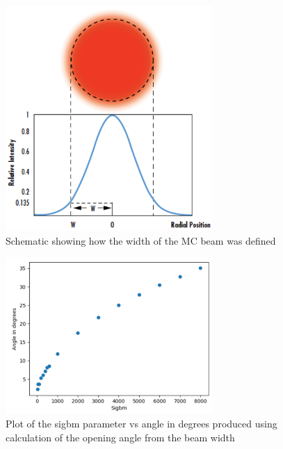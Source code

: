 \begin{figure}
    \centering
    \includegraphics[width=0.7\textwidth]{Figures/beam_width.PNG}
    \caption{Schematic showing how the width of the MC beam was defined}
    \label{fig:beam_width}
\end{figure}

\begin{figure}
    \centering
    \includegraphics[width=0.7\textwidth]{Figures/sigbm_angle_validation.PNG}
    \caption{Plot of the sigbm parameter vs angle in degrees produced using calculation of the opening angle from the beam width}
    \label{fig:sigbm_angle_validation}
\end{figure}

